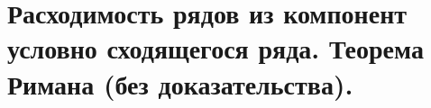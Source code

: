 \documentclass[../main.tex]{subfiles}
\begin{document}
\newpage
\section{Расходимость рядов из компонент условно сходящегося ряда. Теорема Римана (без доказательства).}
\end{document}
